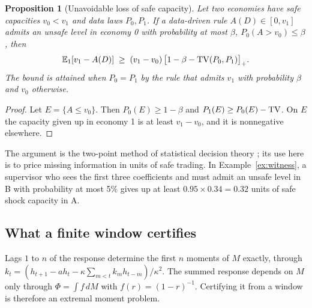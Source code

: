 \documentclass[12pt]{article}
\newtheorem{proposition}[theorem]{Proposition}
\theoremstyle{definition}
\theoremstyle{remark}
\providecommand{\E}{\mathbb{E}}
\begin{document}
\begin{proposition}[Unavoidable loss of safe capacity]\label{prop:twoworld}
Let two economies have safe capacities $v_0<v_1$ and data laws $P_0,P_1$. If a data-driven rule $A(D)\in[0,v_1]$ admits an unsafe level in economy 0 with probability at most $\beta$, $P_0(A>v_0)\le\beta$, then
\[
\E_1[v_1-A(D)]\;\ge\;(v_1-v_0)\,\bigl[1-\beta-{\rm TV}(P_0,P_1)\bigr]_+ .
\]
The bound is attained when $P_0=P_1$ by the rule that admits $v_1$ with probability $\beta$ and $v_0$ otherwise.
\end{proposition}

\begin{proof}
Let $E=\{A\le v_0\}$. Then $P_0(E)\ge1-\beta$ and $P_1(E)\ge P_0(E)-{\rm TV}$. On $E$ the capacity given up in economy 1 is at least $v_1-v_0$, and it is nonnegative elsewhere.
\end{proof}

The argument is the two-point method of statistical decision theory \citep{lecam1986}; its use here is to price missing information in units of safe trading. In Example~\ref{ex:witness}, a supervisor who sees the first three coefficients and must admit an unsafe level in B with probability at most 5\% gives up at least $0.95\times0.34=0.32$ units of safe shock capacity in A.

\subsection{What a finite window certifies}

Lags $1$ to $n$ of the response determine the first $n$ moments of $M$ exactly, through $k_t=(h_{t+1}-ah_t-\kappa\sum_{m<t}k_mh_{t-m})/\kappa^2$. The summed response depends on $M$ only through $\Phi=\int f\,dM$ with $f(r)=(1-r)^{-1}$. Certifying it from a window is therefore an extremal moment problem.
\end{document}
